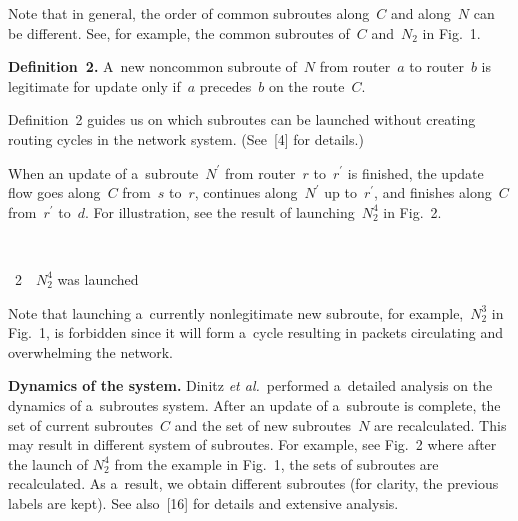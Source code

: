 \begin{multicols}{2}
Note that in general, the order of common subroutes along~$C$ and along~$N$ 
can be different. See, for example, the common subroutes of~$C$ and~$N_2$ in 
Fig.~1.

\smallskip

\noindent
\textbf{Definition~2.} A~new noncommon subroute of~$N$ from router~$a$
to router~$b$ is legitimate for update only if~$a$ precedes~$b$ on the route~$C$.

\smallskip

Definition~2 guides us on which subroutes can be launched without creating routing cycles in the
network system. (See~[4] for details.)


When an update of a~subroute~$N^\prime$ from router~$r$ to~$r^\prime$ is finished, 
the update flow goes along~$C$ from~$s$ to~$r$, continues along~$N^\prime$ up to~$r^\prime$, 
and finishes along~$C$ from~$r^\prime$
 to~$d$. 
For illustration, see the result of launching~$N^4_2$ in Fig.~2.

 { \begin{center}  %
\vspace*{-1pt}
 \mbox{%
 \epsfxsize=78.631mm 
 }


\vspace*{3pt}


\noindent
{{\figurename~2}\ \ \small{$N^4_2$ was launched}}
\end{center}
}

\vspace*{4pt}


 

 Note that launching a~currently nonlegitimate new subroute, for example,~$N^3_2$ 
 in Fig.~1, is forbidden since it will form a~cycle 
 resulting in packets circulating and overwhelming the network. 

\textbf{Dynamics of the system.}
Dinitz \textit{et al.}\ performed a~detailed analysis on the dynamics of a~subroutes
system. After an update of a~subroute is complete, the set of current subroutes~$C$ 
and the set
of new subroutes~$N$ are recalculated. This may result in different system of subroutes. For example,
see Fig.~2 where after the launch of $N^4_2$ from the example in Fig.~1, 
the sets of subroutes are
recalculated. As a~result, we obtain different subroutes (for clarity, the previous labels are kept). See
also~[16] for details and extensive analysis.

\vspace*{-4pt}


\end{multicols}
